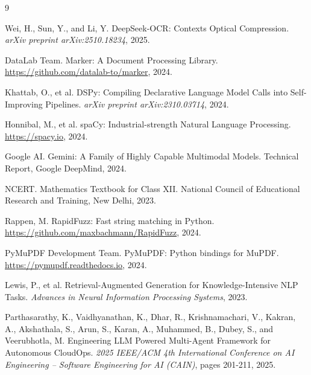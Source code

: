 \documentclass[12pt]{article}
\begin{document}

\begin{thebibliography}{9}

Wei, H., Sun, Y., and Li, Y.
\newblock DeepSeek-OCR: Contexts Optical Compression.
\newblock \emph{arXiv preprint arXiv:2510.18234}, 2025.

DataLab Team.
\newblock Marker: A Document Processing Library.
\newblock \url{https://github.com/datalab-to/marker}, 2024.

Khattab, O., et al.
\newblock DSPy: Compiling Declarative Language Model Calls into Self-Improving Pipelines.
\newblock \emph{arXiv preprint arXiv:2310.03714}, 2024.

Honnibal, M., et al.
\newblock spaCy: Industrial-strength Natural Language Processing.
\newblock \url{https://spacy.io}, 2024.

Google AI.
\newblock Gemini: A Family of Highly Capable Multimodal Models.
\newblock Technical Report, Google DeepMind, 2024.

NCERT.
\newblock Mathematics Textbook for Class XII.
\newblock National Council of Educational Research and Training, New Delhi, 2023.

Rappen, M.
\newblock RapidFuzz: Fast string matching in Python.
\newblock \url{https://github.com/maxbachmann/RapidFuzz}, 2024.

PyMuPDF Development Team.
\newblock PyMuPDF: Python bindings for MuPDF.
\newblock \url{https://pymupdf.readthedocs.io}, 2024.

Lewis, P., et al.
\newblock Retrieval-Augmented Generation for Knowledge-Intensive NLP Tasks.
\newblock \emph{Advances in Neural Information Processing Systems}, 2023.

Parthasarathy, K., Vaidhyanathan, K., Dhar, R., Krishnamachari, V., Kakran, A., Akshathala, S., Arun, S., Karan, A., Muhammed, B., Dubey, S., and Veerubhotla, M.
\newblock Engineering LLM Powered Multi-Agent Framework for Autonomous CloudOps.
\newblock \emph{2025 IEEE/ACM 4th International Conference on AI Engineering – Software Engineering for AI (CAIN)}, pages 201-211, 2025.

\end{thebibliography}
\end{document}
